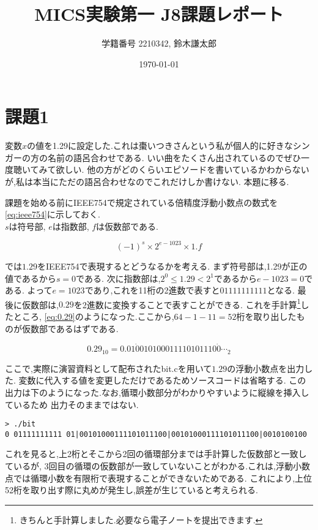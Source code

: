 \documentclass[autodetect-engine, dvi=dvipdfmx, 10pt, a4paper, ja=standard]{bxjsarticle}
\title{MICS実験第一 J8課題レポート}
\author{学籍番号 2210342, 鈴木謙太郎}
\date{\today}
\begin{document}
\maketitle


\section{課題1}
\label{sec:ex-1}
変数$x$の値を1.29に設定した.これは棗いつきさんという私が個人的に好きなシンガーの方の名前の語呂合わせである.
いい曲をたくさん出されているのでぜひ一度聴いてみて欲しい.
他の方がどのくらいエピソードを書いているかわからないが,私は本当にただの語呂合わせなのでこれだけしか書けない.
本題に移る.

課題を始める前にIEEE754で規定されている倍精度浮動小数点の数式を\ref{eq:ieee754}に示しておく.\\
$s$は符号部, $e$は指数部, $f$は仮数部である.

\begin{equation}
	\label{eq:ieee754}
	(-1)^s \times 2^{e-1023} \times 1.f
\end{equation}

では$1.29$をIEEE754で表現するとどうなるかを考える.
まず符号部は,1.29が正の値であるから$s=0$である.
次に指数部は,$2^0 \leq 1.29 < 2^1$であるから$e - 1023 = 0$である.
よって$e = 1023$であり,これを11桁の2進数で表すと$01111111111$となる.
最後に仮数部は,$0.29$を2進数に変換することで表すことができる.
これを手計算\footnote{きちんと手計算しました.必要なら電子ノートを提出できます.}したところ,
\ref{eq:0.29}のようになった.ここから,$64 - 1 - 11 = 52$桁を取り出したものが仮数部であるはずである.

\begin{equation}
	\label{eq:0.29}
	0.29_{10} = 0.01\dot{0}010100011110101110\dot{0} \cdots_2
\end{equation}

ここで,実際に演習資料として配布されたbit.cを用いて$1.29$の浮動小数点を出力した.
変数に代入する値を変更しただけであるためソースコードは省略する.
この出力は下のようになった.なお,循環小数部分がわかりやすいように縦線を挿入しているため
出力そのままではない.

\begin{verbatim}
> ./bit
0 01111111111 01|00101000111101011100|00101000111101011100|0010100100
\end{verbatim}
\label{verb:bit}

これを見ると,上2桁とそこから2回の循環部分までは手計算した仮数部と一致しているが,
3回目の循環の仮数部が一致していないことがわかる.これは,浮動小数点では循環小数を有限桁で表現することができないためである.
これにより,上位52桁を取り出す際に丸めが発生し,誤差が生じていると考えられる.
\end{document}
